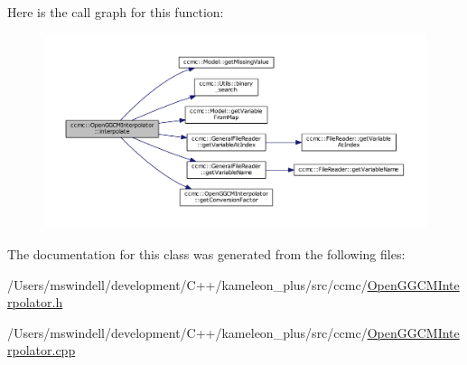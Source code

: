 Here is the call graph for this function\-:
\nopagebreak
\begin{figure}[H]
\begin{center}
\leavevmode
\includegraphics[width=350pt]{classccmc_1_1_open_g_g_c_m_interpolator_ad7edc3f7862deda978513f923fc30c33_cgraph}
\end{center}
\end{figure}




The documentation for this class was generated from the following files\-:\begin{DoxyCompactItemize}
\item 
/\-Users/mswindell/development/\-C++/kameleon\-\_\-plus/src/ccmc/\hyperlink{_open_g_g_c_m_interpolator_8h}{Open\-G\-G\-C\-M\-Interpolator.\-h}\item 
/\-Users/mswindell/development/\-C++/kameleon\-\_\-plus/src/ccmc/\hyperlink{_open_g_g_c_m_interpolator_8cpp}{Open\-G\-G\-C\-M\-Interpolator.\-cpp}\end{DoxyCompactItemize}
